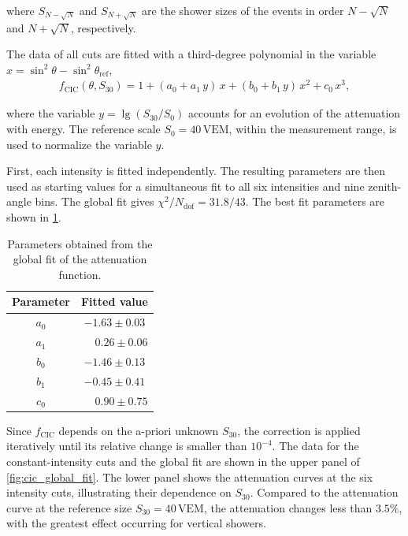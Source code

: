 \documentclass[main.tex]{subfiles}
\begin{document}
\noindent where $S_{N-\sqrt{N}}$ and $S_{N+\sqrt{N}}$ are the shower sizes of the events in order $N-\sqrt{N}$ and $N+\sqrt{N}$, respectively.

The data of all cuts are fitted with a third-degree polynomial in the variable $x=\sin^2\theta-\sin^2\theta_{\text{ref}}$,
\begin{align}
    f_{\text{CIC}}(\theta,S_{30})
    =
    1+(a_0+a_1\,y) \, x+(b_0+b_1\,y)\, x^2+c_0\, x^3,
\end{align}

\noindent where the variable $y=\lg(S_{30}/S_0)$ accounts for an evolution of the attenuation with energy. 
The reference scale $S_0=40\,\text{VEM}$, within the measurement range, is used to normalize the variable $y$.

First, each intensity is fitted independently.
The resulting parameters are then used as starting values for a simultaneous fit to all six intensities and nine zenith-angle bins.
The global fit gives $\chi^2/N_{\text{dof}}=31.8/43$.
The best fit parameters are shown in \cref{table:cic_parameters}.

\begin{table}
    \centering
    \caption{Parameters obtained from the global fit of the  attenuation function.}
    \label{table:cic_parameters}
    \begin{tabular}{cc}
        \hline
        Parameter & Fitted value \\
        \hline
        $a_0$ & $-1.63 \pm 0.03$ \\
        $a_1$ & $\phantom{-}0.26 \pm 0.06$ \\
        $b_0$ & $-1.46 \pm 0.13$ \\
        $b_1$ & $-0.45 \pm 0.41$ \\
        $c_0$ & $\phantom{-}0.90 \pm 0.75$ \\
        \hline
    \end{tabular}
\end{table}

Since $f_{\text{CIC}}$ depends on the a-priori unknown $S_{30}$, the correction is applied iteratively until its relative change is smaller than $10^{-4}$.
The data for the constant-intensity cuts and the global fit are shown in the upper panel of \cref{fig:cic_global_fit}.
The lower panel shows the attenuation curves at the six intensity cuts, illustrating their dependence on $S_{30}$.
Compared to the attenuation curve at the reference size $S_{30}=40\,\mathrm{VEM}$, the attenuation changes less than $3.5\%$, with the greatest effect occurring for vertical showers.
\end{document}
